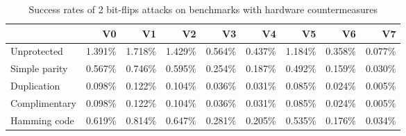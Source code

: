 \begin{table}
  \centering
  \caption{Success rates of 2 bit-flips attacks on benchmarks with hardware countermeasures}
  \label{tab:bitflips}
\begin{tabular}{lrrrrrrrr}
\hline
& V0 & V1 & V2 & V3 & V4 & V5 & V6 & V7 \\
                          \hline
Unprotected                  & 1.391\%                                      & 1.718\%                                       & 1.429\%                                      & 0.564\%                                      & 0.437\%                                       & 1.184\%                                       & 0.358\%                                       & 0.077\%                                       \\
\hline
Simple parity             & 0.567\%                                      & 0.746\%                                       & 0.595\%                                      & 0.254\%                                      & 0.187\%                                      & 0.492\%                                       & 0.159\%                                      & 0.030\%                                       \\
\hline
Duplication               & 0.098\%                                      & 0.122\%                                       & 0.104\%                                      & 0.036\%                                      & 0.031\%                                       & 0.085\%                                       & 0.024\%                                      & 0.005\%                                       \\
\hline
Complimentary & 0.098\%                                      & 0.122\%                                       & 0.104\%                                      & 0.036\%                                      & 0.031\%                                       & 0.085\%                                       & 0.024\%                                      & 0.005\%                                       \\
\hline
Hamming code              & 0.619\%                                      & 0.814\%                                       & 0.647\%                                       & 0.281\%                                      & 0.205\%                                      & 0.535\%                                       & 0.176\%                                      & 0.034\%                                       \\

\end{tabular}
\end{table}
